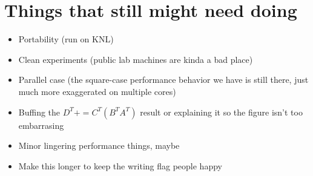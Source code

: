 \documentclass[12pt]{article}
\newcommand*{\pluseq}{\mathrel{{+}{=}}}
\begin{document}
\section{Things that still might need doing}
\begin{itemize}
\item Portability (run on KNL)
\item Clean experiments (public lab machines are kinda a bad place)
\item Parallel case (the square-case performance behavior we have is still there, just much more exaggerated on multiple cores)
\item Buffing the $D^T \pluseq C^T(B^TA^T)$ result or explaining it so the figure isn't too embarrasing
\item Minor lingering performance things, maybe
\item Make this longer to keep the writing flag people happy
\end{itemize}
\printbibliography{}
\end{document}
